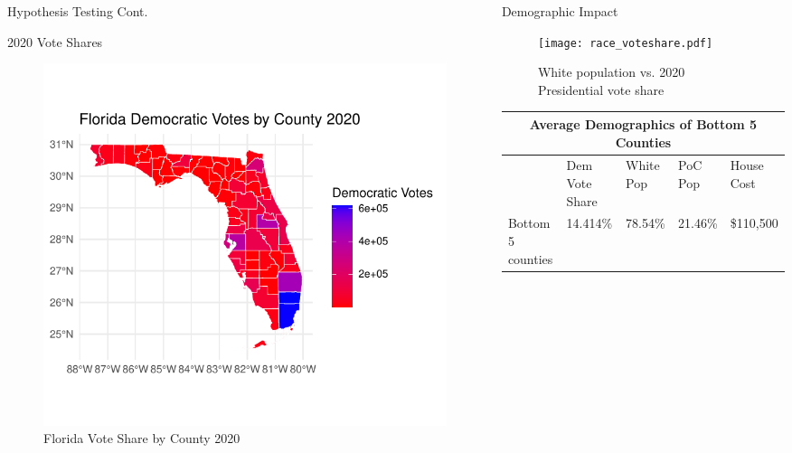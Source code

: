 \documentclass[xcolor=dvipsnames]{beamer}
\newlength{\onecolwid}
\newlength{\twocolwid}
\begin{document}
\begin{frame}[t]
\begin{columns}[t]
\begin{column}{\twocolwid}
\begin{columns}[t,totalwidth=\twocolwid]
\begin{column}{\onecolwid}
\begin{block}{Hypothesis Testing Cont.}
\end{block}


\begin{block}{2020 Vote Shares}
\begin{figure}
\includegraphics[trim={1.45cm 1cm 1.25cm 1cm},clip,scale=2.7]{dem_votes2020.pdf}
\caption{Florida Vote Share by County 2020}
\end{figure}
\end{block}
\end{column} %
\begin{column}{\onecolwid}\vspace{-.6in} %


\begin{block}{Demographic Impact}

\begin{figure}
\texttt{[image: race\_voteshare.pdf]}
\caption{White population vs. 2020 Presidential vote share}
\end{figure}


\begin{tabular}{ |p{5.2cm}|p{5.9cm}|p{5cm}|p{4.2cm}|p{5cm}|}

 \hline
 \multicolumn{5}{|c|}{Average Demographics of Bottom 5 Counties} \\
 \hline
 & Dem Vote Share &White Pop &PoC Pop & House Cost\\
 \hline
 Bottom 5 counties   & 14.414\%    &78.54\%&   21.46\% & \$110,500\\
 \hline


\end{tabular}
\end{block}
\end{column}
\end{columns}
\end{column}
\end{columns}
\end{frame}
\end{document}
